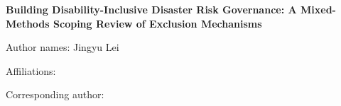 \documentclass[12pt,a4paper]{report}
\date{}
\begin{document}
\thispagestyle{empty}


\vspace{1cm}
\thispagestyle{empty}
\begin{center}

\vspace*{1cm}


{\LARGE\bfseries 
Building Disability-Inclusive Disaster Risk Governance: A Mixed-Methods Scoping Review of Exclusion Mechanisms\par}
\vspace{2cm}

{\large Author names: Jingyu Lei\par}
{\large Affiliations: \par} 
{\large Corresponding author: \par} 






\vfill


\end{center}
\clearpage

\clearpage




\end{document}
